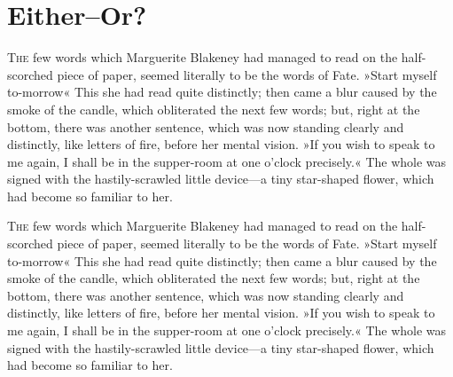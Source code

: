 
\chapter[Either—Or?]{Either–Or?}
	
\makeatletter
{}
{%
\lettrine[lines=4]{T}{he} few words which Marguerite Blakeney had managed to read on the half-scorched piece of paper, seemed literally to be the words of Fate. »Start myself to-morrow\textellipsis« This she had read quite distinctly; then came a blur caused by the smoke of the candle, which obliterated the next few words; but, right at the bottom, there was another sentence, which was now standing clearly and distinctly, like letters of fire, before her mental vision. »If you wish to speak to me again, I shall be in the supper-room at one o'clock precisely.« The whole was signed with the hastily-scrawled little device—a tiny star-shaped flower, which had become so familiar to her.

}{%
\lettrine[lines=4]{T}{he} few words which Marguerite Blakeney had managed to read on the half-scorched piece of paper, \newline seemed literally to be the words of Fate. »Start myself to-morrow\textellipsis« This she had read quite distinctly; then came a blur caused by the smoke of the candle, which obliterated the next few words; but, right at the bottom, there was another sentence, which was now standing clearly and distinctly, like letters of fire, before her mental vision. »If you wish to speak to me again, I shall be in the supper-room at one o'clock precisely.« The whole was signed with the hastily-scrawled little device—a tiny star-shaped flower, which had become so familiar to her.
}
\makeatother
 


